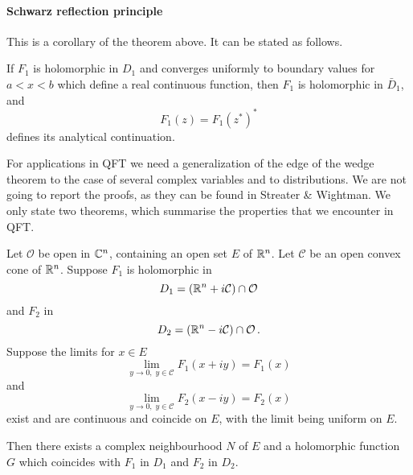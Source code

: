 \paragraph{Schwarz reflection principle} 

This is a corollary of the theorem above. It can be stated as follows. 

If $F_1$ is holomorphic in $D_1$ and converges uniformly to boundary values for
$a<x<b$ which define a real continuous function, then $F_1$ is holomorphic in
$\bar{D}_1$, and
\begin{equation}
    \label{eq:SchwarzAnalytical}
    F_1(z) = F_1(z^*)^*
\end{equation}
defines its analytical continuation. 

For applications in QFT we need a generalization of the edge of the wedge
theorem to the case of several complex variables and to distributions. We are
not going to report the proofs, as they can be found in Streater \& Wightman. We
only state two theorems, which summarise the properties that we encounter in
QFT. 

\begin{Thm}
    \label{thm:EdgeWedgeMultiDim}
    Let $\mathcal{O}$ be open in $\mathbb{C}^n$, containing an open set $E$ of $\mathbb{R}^n$. 
    Let $\mathcal{C}$ be an open convex cone of $\mathbb{R}^n$. Suppose $F_1$ is 
    holomorphic in
    \begin{equation}
        D_1 = \left(\mathbb{R}^n + i \mathcal{C}\right) \cap \mathcal{O} 
    \end{equation} 
    and $F_2$ in 
    \begin{equation}
        D_2 = \left(\mathbb{R}^n - i \mathcal{C}\right) \cap \mathcal{O} \, .
    \end{equation} 
    Suppose the limits for $x\in E$
    \begin{equation}
        \label{eq:UpperEdgeFun}
        \lim_{y\to 0,\; y\in \mathcal{C}} F_1(x+iy) = F_1(x) 
    \end{equation}
    and
    \begin{equation}
        \label{eq:LowerEdgeFun}
        \lim_{y\to 0,\; y\in \mathcal{C}} F_2(x-iy) = F_2(x) 
    \end{equation}
    exist and are continuous and coincide on $E$, with the limit
    being uniform on $E$. 

    Then there exists a complex neighbourhood $N$ of $E$ and a 
    holomorphic function $G$ which coincides with $F_1$ in $D_1$ 
    and $F_2$ in $D_2$. 
\end{Thm}

